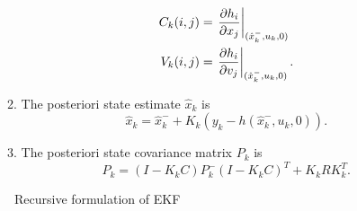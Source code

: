 \begin{itemize}
\begin{enumerate}
		\begin{equation}
		\begin{split}
		C_k(i,j) &= \left. \frac{\partial {h_i}}{\partial {x_j}}\right \vert_{(\hat{x}_k^-,u_k,0)} \\
		V_k(i,j) &= \left. \frac{\partial {h_i}}{\partial {v_j}}\right \vert_{(\hat{x}_k^-,u_k,0)}.
		\end{split}
		\end{equation}
	\item The posteriori state estimate $\hat x_k$ is
		$$\hat{x}_k = \hat{x}_k^- + K_k(y_k-h(\hat{x}_k^-,u_k,0)).$$
	\item The posteriori state covariance matrix $P_k$ is
			$${P}_{k} = (I - {K}_k {C}) {P}_{k}^{-} (I - {K}_k {C})^{T} + {K}_k {R} {K}_k^{T}.$$
\end{enumerate}
\end{itemize}
\begin{figure}  

\caption{Recursive formulation of EKF}
\label{fig:ekf_blk}
\end{figure}


